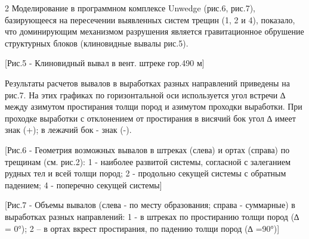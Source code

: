 \begin{multicols}{2}
Моделирование в программном комплексе Unwedge (рис.6, рис.7),
базирующееся на пересечении выявленных систем трещин (1, 2 и 4),
показало, что доминирующим механизмом разрушения является гравитационное
обрушение структурных блоков (клиновидные вывалы рис.5).

[Рис.5 - Клиновидный вывал в вент. штреке гор.490 м]

Результаты расчетов вывалов в выработках разных направлений приведены на
рис.7. На этих графиках по горизонтальной оси используется угол встречи
\emph{∆} между азимутом простирания толщи пород и азимутом проходки
выработки. При проходке выработки с отклонением от простирания в висячий
бок угол \emph{∆} имеет знак (+); в лежачий бок - знак (-).
\end{multicols}

[Рис.6 - Геометрия возможных вывалов в штреках (слева) и ортах
(справа) по трещинам (см. рис.2): 1 - наиболее развитой системы,
согласной с залеганием рудных тел и всей толщи пород; 2 - продольно
секущей системы с обратным падением; 4 - поперечно секущей системы]

[Рис.7 - Объемы вывалов (слева - по месту образования; справа -
суммарные) в выработках разных направлений: 1 - в штреках по простиранию
толщи пород (∆ = 0°); 2 -- в ортах вкрест простирания, по падению толщи
пород (∆ =90°)]

